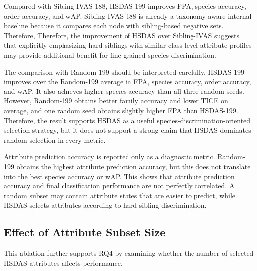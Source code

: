 Compared with Sibling-IVAS-188, HSDAS-199 improves FPA, species accuracy, order accuracy, and wAP. Sibling-IVAS-188 is already a taxonomy-aware internal baseline because it compares each node with sibling-based negative sets. Therefore, Therefore, the improvement of HSDAS over Sibling-IVAS suggests that explicitly emphasizing hard siblings with similar class-level attribute profiles may provide additional benefit for fine-grained species discrimination.

The comparison with Random-199 should be interpreted carefully. HSDAS-199 improves over the Random-199 average in FPA, species accuracy, order accuracy, and wAP. It also achieves higher species accuracy than all three random seeds. However, Random-199 obtains better family accuracy and lower TICE on average, and one random seed obtains slightly higher FPA than HSDAS-199. Therefore, the result supports HSDAS as a useful species-discrimination-oriented selection strategy, but it does not support a strong claim that HSDAS dominates random selection in every metric.

Attribute prediction accuracy is reported only as a diagnostic metric. Random-199 obtains the highest attribute prediction accuracy, but this does not translate into the best species accuracy or wAP. This shows that attribute prediction accuracy and final classification performance are not perfectly correlated. A random subset may contain attribute states that are easier to predict, while HSDAS selects attributes according to hard-sibling discrimination.













\subsection{Effect of Attribute Subset Size}

This ablation further supports RQ4 by examining whether the number of selected HSDAS attributes affects performance.

